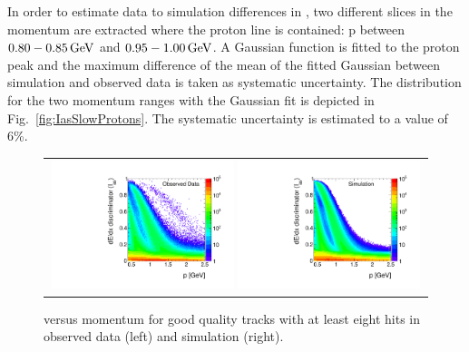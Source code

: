 In order to estimate data to simulation differences in \ias, two different slices in the momentum are extracted where the proton line is contained: p between $0.80-0.85\,\text{Ge}\kern-0.06667em\text{V}$ and $0.95-1.00\,\text{Ge}\kern-0.06667em\text{V}$.
A Gaussian function is fitted to the proton peak and the maximum difference of the mean of the fitted Gaussian between simulation and observed data is taken as systematic uncertainty.
The \ias distribution for the two momentum ranges with the Gaussian fit is depicted in Fig.~\ref{fig:IasSlowProtons}.
The systematic uncertainty is estimated to a value of 6\%.
\begin{figure}[!h]
  \centering 
  \begin{tabular}{c}
    \includegraphics[width=0.49\textwidth]{figures/analysis/Interpretation/IasP_Data.pdf} 
    \includegraphics[width=0.49\textwidth]{figures/analysis/Interpretation/IasP_MC.pdf}
  \end{tabular}
  \caption{\ias versus momentum for good quality tracks with at least eight hits in observed data (left) and simulation (right).}
  \label{fig:IasVsMomentum}
\end{figure} 

